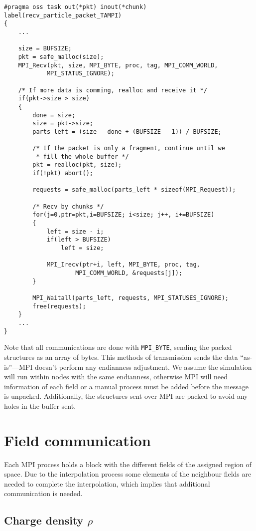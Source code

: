 \begin{lstlisting}
#pragma oss task out(*pkt) inout(*chunk) label(recv_particle_packet_TAMPI)
{
	...

	size = BUFSIZE;
	pkt = safe_malloc(size);
	MPI_Recv(pkt, size, MPI_BYTE, proc, tag, MPI_COMM_WORLD,
			MPI_STATUS_IGNORE);

	/* If more data is comming, realloc and receive it */
	if(pkt->size > size)
	{
		done = size;
		size = pkt->size;
		parts_left = (size - done + (BUFSIZE - 1)) / BUFSIZE;

		/* If the packet is only a fragment, continue until we
		 * fill the whole buffer */
		pkt = realloc(pkt, size);
		if(!pkt) abort();

		requests = safe_malloc(parts_left * sizeof(MPI_Request));

		/* Recv by chunks */
		for(j=0,ptr=pkt,i=BUFSIZE; i<size; j++, i+=BUFSIZE)
		{
			left = size - i;
			if(left > BUFSIZE)
				left = size;

			MPI_Irecv(ptr+i, left, MPI_BYTE, proc, tag,
					MPI_COMM_WORLD, &requests[j]);
		}

		MPI_Waitall(parts_left, requests, MPI_STATUSES_IGNORE);
		free(requests);
	}
	...
}
\end{lstlisting}

Note that all communications are done with \texttt{MPI\_BYTE}, sending the 
packed structures as an array of bytes. This methods of transmission sends the 
data ``as-is''---MPI doesn't perform any endianness adjustment. We assume the 
simulation will run within nodes with the same endianness, otherwise MPI will 
need information of each field or a manual process must be added before the 
message is unpacked. Additionally, the structures sent over MPI are packed to 
avoid any holes in the buffer sent.

\section{Field communication}

Each MPI process holds a block with the different fields of the assigned region 
of space. Due to the interpolation process some elements of the neighbour fields 
are needed to complete the interpolation, which implies that additional 
communication is needed.

\subsection{Charge density $\rho$}

